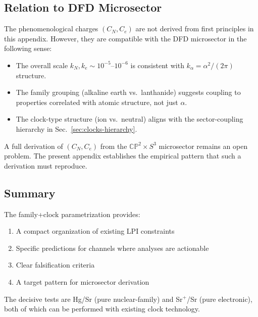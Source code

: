 \subsection{Relation to DFD Microsector}\label{app:fc-dfd}

The phenomenological charges $(C_N, C_e)$ are not derived from first 
principles in this appendix. However, they are compatible with the 
DFD microsector in the following sense:
\begin{itemize}
\item The overall scale $k_N, k_e \sim 10^{-5}$--$10^{-6}$ is consistent 
with $k_\alpha = \alpha^2/(2\pi)$ structure.
\item The family grouping (alkaline earth vs.\ lanthanide) suggests 
coupling to properties correlated with atomic structure, not just $\alpha$.
\item The clock-type structure (ion vs.\ neutral) aligns with the 
sector-coupling hierarchy in Sec.~\ref{sec:clocks-hierarchy}.
\end{itemize}

A full derivation of $(C_N, C_e)$ from the $\mathbb{CP}^2 \times S^3$ microsector 
remains an open problem. The present appendix establishes the empirical 
pattern that such a derivation must reproduce.

\subsection{Summary}\label{app:fc-summary}

The family+clock parametrization provides:
\begin{enumerate}
\item A compact organization of existing LPI constraints
\item Specific predictions for channels where analyses are actionable
\item Clear falsification criteria
\item A target pattern for microsector derivation
\end{enumerate}

The decisive tests are Hg/Sr (pure nuclear-family) and Sr$^+$/Sr 
(pure electronic), both of which can be performed with existing clock 
technology.
